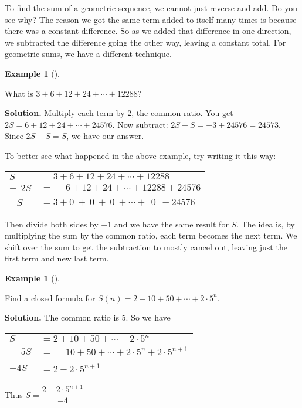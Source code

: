 \documentclass[10pt,]{book}
\theoremstyle{plain}
\theoremstyle{definition}
\newtheorem{example}[theorem]{Example}
\theoremstyle{definition}
\theoremstyle{definition}
\numberwithin{equation}{chapter}
\newcommand{\hrulethin}  {\noalign{\hrule height 0.04em}}
\begin{document}
        To find the sum of a geometric sequence, we cannot just reverse and add. Do you see why? The reason we got the same term added to itself many times is because there was a constant difference. So as we added that difference in one direction, we subtracted the difference going the other way, leaving a constant total. For geometric sums, we have a different technique.
\begin{example}[]\label{example-65}

            What is \(3 + 6 + 12 + 24 + \cdots + 12288\)?
\par\medskip\noindent%
\textbf{Solution.}\quad
            Multiply each term by 2, the common ratio. You get \(2S = 6 + 12 + 24 + \cdots + 24576\). Now subtract: \(2S - S = -3 + 24576 = 24573\). Since \(2S - S = S\), we have our answer.
\end{example}
\par

        To better see what happened in the above example, try writing it this way:
\begin{tabular}{ll}
\(S\)&\(= 3 + 6 + 12 + 24 + \cdots + 12288\)\tabularnewline[0pt]
\(-~~2S\)&\(= ~~~~~~6 + 12 + 24 + \cdots + 12288 + 24576\)\tabularnewline[0pt]
&\tabularnewline\hrulethin
\(-S\)&\(= 3 + 0 ~+~ 0 ~+~ 0 ~ +  \cdots + ~~0 ~~ - 24576\)
\end{tabular}
\par

        Then divide both sides by \(-1\) and we have the same result for \(S\). The idea is, by multiplying the sum by the common ratio, each term becomes the next term. We shift over the sum to get the subtraction to mostly cancel out, leaving just the first term and new last term.
\begin{example}[]\label{example-66}

            Find a closed formula for \(S(n) = 2 + 10 + 50 + \cdots + 2\cdot 5^n\).
\par\medskip\noindent%
\textbf{Solution.}\quad
            The common ratio is 5. So we have
\begin{tabular}{ll}
\(S\)&\(= 2 + 10 + 50 + \cdots + 2\cdot 5^n\)\tabularnewline[0pt]
\(-~~5S\)&\(= ~~~~~~10 + 50 + \cdots + 2\cdot 5^n + 2\cdot5^{n+1}\)\tabularnewline[0pt]
&\tabularnewline\hrulethin
\(-4S\)&\(= 2  - 2\cdot5^{n+1}\)
\end{tabular}
\par

            Thus \(S = \dfrac{2-2\cdot 5^{n+1}}{-4}\)
\end{example}
\par
\end{document}

